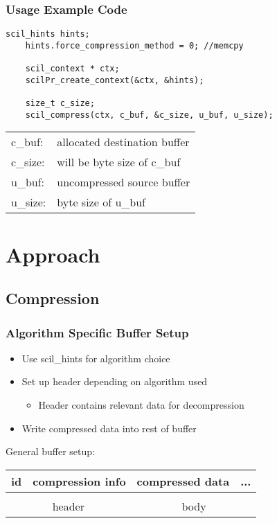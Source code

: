\documentclass[compress]{beamer}
\begin{document}
\begin{frame}[fragile]
	\frametitle{Usage Example Code}

	\begin{lstlisting}[caption=SCIL usage example]
	scil_hints hints;
	hints.force_compression_method = 0; //memcpy

	scil_context * ctx;
	scilPr_create_context(&ctx, &hints);

	size_t c_size;
	scil_compress(ctx, c_buf, &c_size, u_buf, u_size);
	\end{lstlisting}

	\footnotesize{
	\begin{tabular}{ll}
		c\_buf: & allocated destination buffer \\
		c\_size: & will be byte size of c\_buf \\
		u\_buf: & uncompressed source buffer \\
		u\_size: & byte size of u\_buf
	\end{tabular}
	}

\end{frame}

\section{Approach}
\subsection{Compression}

\begin{frame}
	\frametitle{Algorithm Specific Buffer Setup}

	\begin{itemize}
		\item Use scil\_hints for algorithm choice
		\item Set up header depending on algorithm used
		\begin{itemize}
			\item Header contains relevant data for decompression
		\end{itemize}
		\item Write compressed data into rest of buffer
	\end{itemize}

	\bigskip

	General buffer setup:\\
	\begin{center}
	\begin{tabular}{|c|c|cc|}
		\hline
		id & compression info & compressed data & ... \\
		\hline
		\multicolumn{2}{|c|}{} & \multicolumn{2}{c|}{} \\
		\multicolumn{2}{c}{header} & \multicolumn{2}{c}{body}
	\end{tabular}
	\end{center}
\end{frame}
\end{document}
